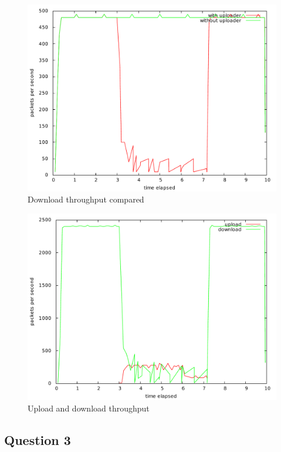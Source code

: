 \documentclass[10pt,a4paper]{article}
\begin{document}
\begin{figure}[p]
    \centering
    \includegraphics[width=\textwidth]{../part1/q1/plots/1.pdf}
    \caption{Download throughput compared}
    \label{fig:lala}
\end{figure}


\begin{figure}[p]
    \centering
    \includegraphics[width=\textwidth]{../part1/q2/plots/2.pdf}
    \caption{Upload and download throughput}
    \label{fig:combined1}
\end{figure}

\subsection{Question 3}
\end{document}
